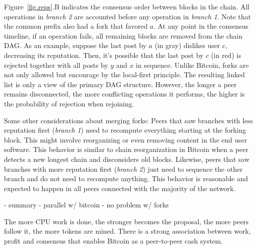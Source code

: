 \documentclass[10pt,journal,compsoc]{IEEEtran}
\newcommand{\reps} {\emph{reps}\xspace}
\begin{document}
Figure~\ref{fig.reps}.B indicates the consensus order between blocks in the
chain.
All operations in \emph{branch 2} are accounted before any operation in
\emph{branch 1}.
Note that the common prefix also had a fork that favored $a$.
%
At any point in the consensus timeline, if an operation fails, all remaining
blocks are removed from the chain DAG.
As an example, suppose the last post by $a$ (in gray) dislikes user $c$,
decreasing its reputation.
Then, it's possible that the last post by $c$ (in red) is rejected together
with all posts by $y$ and $x$ in sequence.
%
Unlike Bitcoin, forks are not only allowed but encourage by the local-first
principle.
The resulting linked list is only a view of the primary DAG structure.
However, the longer a peer remains disconnected, the more conflicting
operations it performs, the higher is the probability of rejection when
rejoining.

Some other considerations about merging forks:
Peers that saw branches with less reputation first (\emph{branch 1}) need to
recompute everything starting at the forking block.
This might involve reorganizing or even removing content in the end user
software.
This behavior is similar to chain reorganization in Bitcoin when a peer detects
a new longest chain and disconsiders old blocks.
%
Likewise, peers that saw branches with more reputation first (\emph{branch 2})
just need to sequence the other branch and do not need to recompute anything.
This behavior is reasonable and expected to happen in all peers connected with
the majority of the network.

- summary
    - parallel w/ bitcoin
    - no problem w/ forks

The more CPU work is done, the stronger becomes the proposal, the more peers
follow it, the more tokens are mined.
There is a strong association between work, profit and consensus that enables
Bitcoin as a peer-to-peer cash system.

\end{document}
